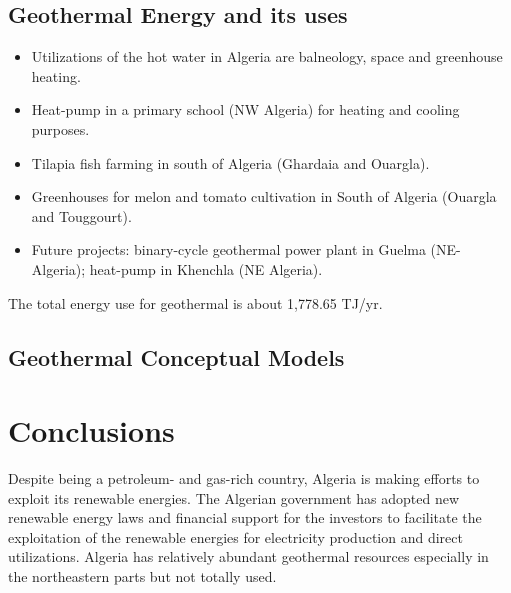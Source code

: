 \documentclass{a0poster}
\begin{document}
\begin{multicols}{3}
\subsection*{Geothermal Energy and its uses}
\begin{itemize}
\item Utilizations of the hot water in Algeria are balneology, space and greenhouse heating.
\item Heat-pump in a primary school (NW Algeria) for heating and cooling purposes.
\item Tilapia fish farming in south of Algeria (Ghardaia and Ouargla).
\item Greenhouses for melon and tomato cultivation in South of Algeria (Ouargla and Touggourt).
\item Future projects: binary-cycle geothermal power plant in Guelma (NE-Algeria); heat-pump in Khenchla (NE Algeria).
\end{itemize}
The total energy use for geothermal is about 1,778.65 TJ/yr.

\begin{center}\vspace{1cm}
\end{center}\vspace{1cm}

\subsection*{Geothermal Conceptual Models}
\begin{center}\vspace{1cm}
\end{center}


\color{SaddleBrown} %

\section*{Conclusions}
Despite being a petroleum- and gas-rich country, Algeria is making efforts to exploit its renewable energies. The Algerian government has adopted new renewable energy laws and financial support for the investors to facilitate the exploitation of the renewable energies for electricity production and direct utilizations. Algeria has relatively abundant geothermal resources especially in the northeastern parts but not totally used.
\color{Black} %


\end{multicols}
\end{document}
